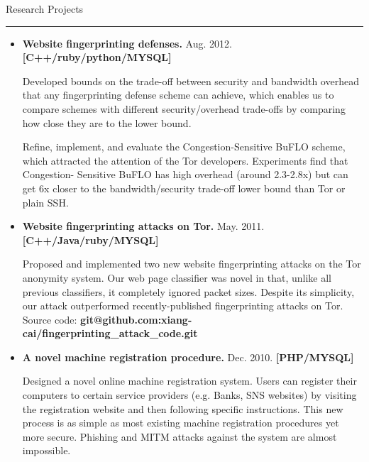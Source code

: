 \documentclass[11pt,oneside]{article}
\newenvironment{ressection}[1]{
	\vspace{-1pt}
	{\fontfamily{phv}\selectfont\Large#1}
	
	\vspace{-8pt} \rule{\textwidth}{.5pt}
	
	\vspace{-8pt}
	\begin{itemize}
	\vspace{.5pt}
}{
	\end{itemize}
}
\newcommand{\resitem}[1]{
	\vspace{1pt}
	\item \begin{flushleft} #1 \end{flushleft}
}
\begin{document}
\begin{ressection}{Research Projects}

	\resitem{\textbf{Website fingerprinting defenses.} Aug.
		2012. \hfill\textbf{[C++/ruby/python/MYSQL]} 
		\vspace{-2pt}
		\begin{small}

		Developed bounds on the trade-off between security and
		bandwidth overhead that any fingerprinting defense scheme can
		achieve, which enables us to compare schemes with different
		security/overhead trade-offs by comparing how close they are
		to the lower bound. 
		
		Refine, implement, and evaluate
		the Congestion-Sensitive BuFLO scheme, which attracted the attention of the
		Tor developers. Experiments find that Congestion-
		Sensitive BuFLO has high overhead (around 2.3-2.8x) but can
		get 6x closer to the bandwidth/security trade-off lower bound
		than Tor or plain SSH.
		\end{small}				
	}
	\vspace{-4pt}
	\resitem{\textbf{Website fingerprinting attacks on Tor.} May.
		2011. \hfill\textbf{[C++/Java/ruby/MYSQL]} 
		\vspace{-2pt}
		\begin{small}

		Proposed and implemented two new website fingerprinting
			attacks on the Tor anonymity system. Our web page
			classifier was novel in that, unlike all previous
			classifiers, it completely ignored packet sizes. Despite
			its simplicity, our attack outperformed 
			recently-published fingerprinting attacks on Tor. Source code: \textbf{git@github.com:xiang-cai/fingerprinting\_attack\_code.git}
		\end{small}				
	}

	\vspace{-4pt}
	\resitem{\textbf{A novel machine registration procedure.} Dec. 
		2010. \hfill\textbf{[PHP/MYSQL]}
		\vspace{-2pt}
		\begin{small}
		
		Designed a novel online machine
			registration system. Users can register their computers to
			certain service providers (e.g. Banks, SNS websites) by
			visiting the registration website and then following specific
			instructions. This new process is as simple as most existing
			machine registration procedures yet more secure. Phishing and MITM attacks against the
			system are almost impossible.
		\end{small}	
	}
			

\end{ressection}
\end{document}
